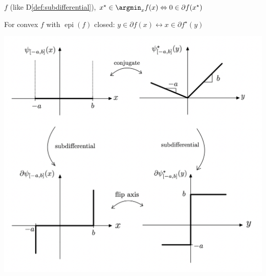 
\begin{proposition}[]
	$f$ (like D\ref{def:subdifferential}),
	$x^\star\in\argmin_x f(x)
		\Leftrightarrow
		0 \in\partial f(x^\star)$
\end{proposition}

\begin{proposition}
	For convex $f$ with $\operatorname{epi}(f)$ closed:
	$y \in \partial f(x) \leftrightarrow x \in \partial f^\star(y)$
\end{proposition}

\includegraphics[width=\columnwidth]{images/conjugate_subdiff.png}
